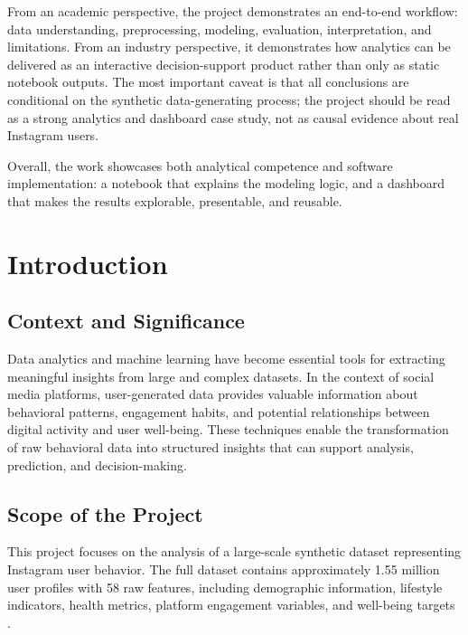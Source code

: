 \documentclass[12pt,a4paper]{article}
\begin{document}
From an academic perspective, the project demonstrates an end-to-end workflow: data understanding, preprocessing, modeling, evaluation, interpretation, and limitations. From an industry perspective, it demonstrates how analytics can be delivered as an interactive decision-support product rather than only as static notebook outputs. The most important caveat is that all conclusions are conditional on the synthetic data-generating process; the project should be read as a strong analytics and dashboard case study, not as causal evidence about real Instagram users.

Overall, the work showcases both analytical competence and software implementation: a notebook that explains the modeling logic, and a dashboard that makes the results explorable, presentable, and reusable.

\newpage

\tableofcontents
\newpage

\listoffigures
\newpage

\section{Introduction}

\subsection{Context and Significance}

Data analytics and machine learning have become essential tools for extracting meaningful insights from large and complex datasets. In the context of social media platforms, user-generated data provides valuable information about behavioral patterns, engagement habits, and potential relationships between digital activity and user well-being. These techniques enable the transformation of raw behavioral data into structured insights that can support analysis, prediction, and decision-making.

\subsection{Scope of the Project}

This project focuses on the analysis of a large-scale synthetic dataset representing Instagram user behavior. The full dataset contains approximately 1.55 million user profiles with 58 raw features, including demographic information, lifestyle indicators, health metrics, platform engagement variables, and well-being targets \cite{SocialMediaDataset2025}.
\end{document}

